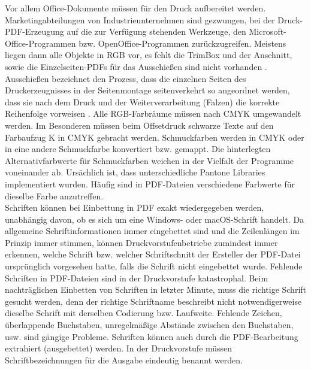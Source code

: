 Vor allem Office-Dokumente müssen für den Druck aufbereitet werden. Marketingabteilungen von Industrieunternehmen sind gezwungen, bei der Druck-PDF-Erzeugung auf die zur Verfügung stehenden Werkzeuge, den Microsoft-Office-Programmen bzw. OpenOffice-Programmen zurückzugreifen. Meistens liegen dann alle Objekte in RGB vor, es fehlt die TrimBox und der Anschnitt, sowie die Einzelseiten-PDFs für das Ausschießen sind nicht vorhanden \cite{schneeberger}. Ausschießen bezeichnet den Prozess, dass die einzelnen Seiten des Druckerzeugnisses in der Seitenmontage seitenverkehrt so angeordnet werden, dass sie nach dem Druck und der Weiterverarbeitung (Falzen) die korrekte Reihenfolge vorweisen \cite{kompendium}. Alle RGB-Farbräume müssen nach CMYK umgewandelt werden. Im Besonderen müssen beim Offsetdruck schwarze Texte auf den Farbaufzug K in CMYK gebracht werden. Schmuckfarben werden in CMYK oder in eine andere Schmuckfarbe konvertiert bzw. gemappt. Die hinterlegten Alternativfarbwerte für Schmuckfarben weichen in der Vielfalt der Programme voneinander ab. Ursächlich ist, dass unterschiedliche Pantone Libraries implementiert wurden. Häufig sind in PDF-Dateien verschiedene Farbwerte für dieselbe Farbe anzutreffen. \\
Schriften können bei Einbettung in PDF exakt wiedergegeben werden, unabhängig davon, ob es sich um eine Windows- oder macOS-Schrift handelt. Da allgemeine Schriftinformationen immer eingebettet sind und die Zeilenlängen im Prinzip immer stimmen, können Druckvorstufenbetriebe zumindest immer erkennen, welche Schrift bzw. welcher Schriftschnitt der Ersteller der PDF-Datei ursprünglich vorgesehen hatte, falls die Schrift nicht eingebettet wurde. Fehlende Schriften in PDF-Dateien sind in der Druckvorstufe katastrophal. Beim nachträglichen Einbetten von Schriften in letzter Minute, muss die richtige Schrift gesucht werden, denn der richtige Schriftname beschreibt nicht notwendigerweise dieselbe Schrift mit derselben Codierung bzw. Laufweite. Fehlende Zeichen, überlappende Buchstaben, unregelmäßige Abstände zwischen den Buchstaben, usw. sind gängige Probleme. Schriften können auch durch die PDF-Bearbeitung extrahiert (ausgebettet) werden. In der Druckvorstufe müssen Schriftbezeichnungen für die Ausgabe eindeutig benannt werden. \\
